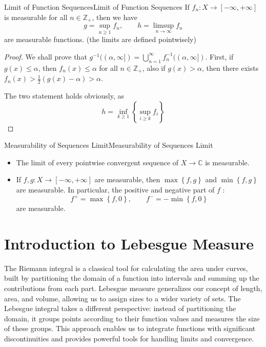 \documentclass[../main.tex]{subfiles}
\begin{document}
\begin{theorem}{Limit of Function Sequences}{Limit of Function Sequences}
	If $f_n: X \rightarrow [-\infty ,+\infty ]$ is measurable for all $n\in \mathbb{Z}_+$, then we have
	\begin{equation*}
		g = \sup_{n \geq 1} f_n, \qquad h = \limsup_{n\rightarrow \infty } f_n
	\end{equation*}
	are measurable functions. (the limits are defined pointwisely)
\end{theorem}
\begin{proof}
	We shall prove that $g^{-1}((\alpha,\infty ]) = \bigcup_{n=1}^{\infty } f_n^{-1}((\alpha, \infty ])$. First, if $g(x) \leq \alpha$, then $f_n(x) \leq \alpha$ for all $n\in \mathbb{Z}_+$, also if $g(x) > \alpha$, then there exists $f_n(x) > \frac{1}{2}(g(x) - \alpha) > \alpha$.

	The two statement holds obviously, as
	\begin{equation*}
	h = \inf_{k \geq 1} \left\{ \sup_{i\geq k}f_i \right\}
	\end{equation*}
\end{proof}

\begin{corollary}{Measurability of Sequences Limit}{Measurability of Sequences Limit}
\begin{itemize}
\item The limit of every pointwise convergent sequence of $X \rightarrow \mathbb{C}$ is measurable.
\item If $f,g: X \rightarrow [-\infty ,+\infty ]$ are measurable, then $\max \left\{ f,g \right\}$ and $\min \left\{ f,g \right\}$ are measurable. In particular, the positive and negative part of $f$ :
	\begin{equation*}
		f^+ = \max \left\{ f,0 \right\}, \qquad f^- = -\min \left\{ f,0 \right\}
	\end{equation*}
	are measurable.
\end{itemize}
\end{corollary}


\section{Introduction to Lebesgue Measure}
The Riemann integral is a classical tool for calculating the area under curves, built by partitioning the domain of a function into intervals and summing up the contributions from each part. Lebesgue measure generalizes our concept of length, area, and volume, allowing us to assign sizes to a wider variety of sets. The Lebesgue integral takes a different perspective: instead of partitioning the domain, it groups points according to their function values and measures the size of these groups. This approach enables us to integrate functions with significant discontinuities and provides powerful tools for handling limits and convergence.
\end{document}
